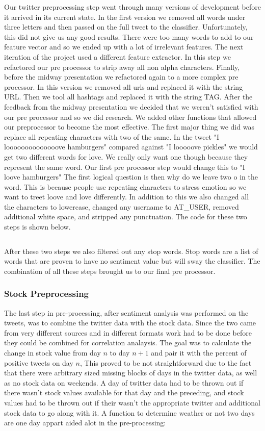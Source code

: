 \documentclass{acm_proc_article-sp}
\begin{document}
Our twitter preprocessing step went through many versions of development before
it arrived in its current state. In the first version we removed all words
under three letters and then passed on the full tweet to the classifier.
Unfortunately, this did not give us any good results. There were too many words
to add to our feature vector and so we ended up with a lot of irrelevant
features. The next iteration of the project used a different feature extractor.
In this step we refactored our pre processor to strip away all non alpha
characters. Finally, before the midway presentation we refactored again to a
more complex pre processor. In this version we removed all urls and replaced it
with the string URL. Then we tool all hashtags and replaced it with the string
TAG. After the feedback from the midway presentation we decided that we weren't
satisfied with our pre processor and so we did research.  We added other
functions that allowed our preprocessor to become the most effective. The first
major thing we did was replace all repeating characters with two of the same.
In the tweet "I loooooooooooooove hamburgers" compared against "I looooove
pickles" we would get two different words for love. We really only want one
though because they represent the same word. Our first pre processor step would
change this to "I loove hamburgers" The first logical question is then why do
we leave two o in the word. This is because people use repeating characters to
stress emotion so we want to treet loove and love differently. In addition to
this we also changed all the characters to lowercase, changed any username to
AT\_USER, removed additional white space, and stripped any punctuation. The
code for these two steps is shown below.

\break
\inputminted{python}{examples/preTweet.py}

After these two steps we also filtered out any stop words. Stop words are a
list of words that are proven to have no sentiment value but will sway the
classifier. The combination of all these steps brought us to our final pre
processor.

\subsubsection{Stock Preprocessing}
 
The last step in pre-processing, after sentiment analysis was performed on the
tweets, was to combine the twitter data with the stock data. Since the two came
from very different sources and in different formats work had to be done before
they could be combined for correlation analaysis. The goal was to calculate the
change in stock value from day $n$ to day $n+1$ and pair it with the percent of
positive tweets on day $n$, This proved to be not straightforward due to the
fact that there were arbitrary sized missing blocks of days in the twitter
data, as well as no stock data on weekends. A day of twitter data had to be
thrown out if there wasn't stock values available for that day and the
preceding, and stock values had to be thrown out if their wasn't the
appropriate twitter and additional stock data to go along with it. A function
to determine weather or not two days are one day appart aided alot in the
pre-processing:
\end{document}

